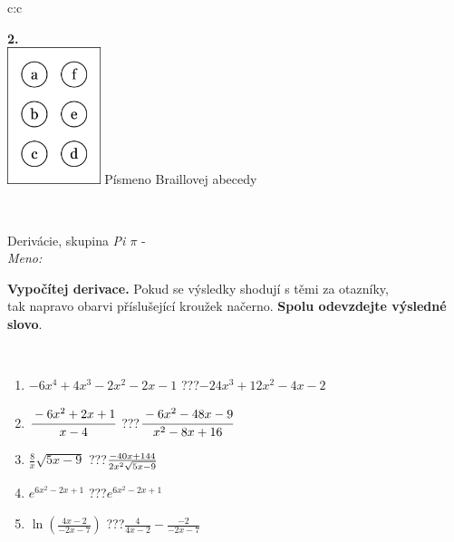 \documentclass[10pt]{report}
\begin{document}
\begin{tabular}{c:c}
\begin{minipage}[c][104.5mm][t]{0.5\linewidth}
\begin{center}
\begin{minipage}{0.20\linewidth}
\begin{center}
{\Huge\bfseries 2.} \\[2mm]
\includegraphics[height=40mm]{../images/braille.png}
{\small Písmeno Braillovej abecedy}
\end{center}
\end{minipage}
\end{center}
\end{minipage}
\\ \hdashline
\begin{minipage}[c][104.5mm][t]{0.5\linewidth}
\begin{center}
\vspace{7mm}
{\huge Derivácie, skupina \textit{Pi $\pi$} -}\\[5mm]
\textit{Meno:}\phantom{xxxxxxxxxxxxxxxxxxxxxxxxxxxxxxxxxxxxxxxxxxxxxxxxxxxxxxxxxxxxxxxxx}\\[5mm]
\begin{minipage}{0.95\linewidth}
\begin{center}
\textbf{Vypočítej derivace.} Pokud se výsledky shodují s těmi za otazníky,\\tak napravo obarvi příslušející kroužek načerno. \textbf{Spolu odevzdejte výsledné slovo}.
\end{center}
\end{minipage}
\\[1mm]
\begin{minipage}{0.79\linewidth}
\begin{center}
\begin{varwidth}{\linewidth}
\begin{enumerate}
\normalsize
\item $-6x^4+4x^3-2x^2-2x-1$\quad \dotfill\; ???\;\dotfill \quad $-24x^3+12x^2-4x-2$
\item $\cfrac{-6x^2+2x+1}{x-4}$\quad \dotfill\; ???\;\dotfill \quad $\cfrac{-6x^2-48x-9}{x^2-8x+16}$
\item $\frac{8}{x}\sqrt{5x-9}$\quad \dotfill\; ???\;\dotfill \quad $\frac{-40x+144}{2x^2 \sqrt{\smash[b]{5x-9}}}$
\item $e^{6x^2-2x+1}$\quad \dotfill\; ???\;\dotfill \quad $e^{6x^2-2x+1}$
\item $\ln{\left(\frac{4x-2}{-2x-7}\right)}$\quad \dotfill\; ???\;\dotfill \quad $\frac{4}{4x-2}-\frac{-2}{-2x-7}$

\end{enumerate}
\end{varwidth}
\end{center}
\end{minipage}
\end{center}
\end{minipage}
\end{tabular}
\end{document}
